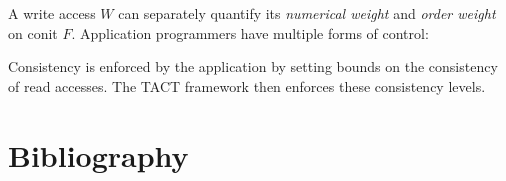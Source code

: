 \documentclass[]             %
{NASA}                       %
\theoremstyle{definition}
\begin{document}
A write access \(W\) can separately quantify its \emph{numerical weight}
and \emph{order weight} on conit \(F\). Application programmers have
multiple forms of control:

Consistency is enforced by the application by setting bounds on the
consistency of read accesses. The TACT framework then enforces these
consistency levels.



\section*{Bibliography}\label{bibliography}



\end{document}
